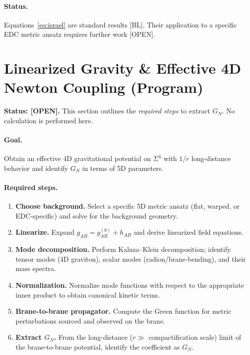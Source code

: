 \documentclass[11pt,a4paper]{article}
\newcommand{\tagBL}{\textcolor{blue!70!black}{[BL]}}
\newcommand{\tagOPEN}{\textcolor{red!70!black}{[OPEN]}}
\begin{document}
\paragraph{Status.}
Equations~\eqref{eq:israel} are standard results \tagBL{}.
Their application to a specific EDC metric ansatz requires further work \tagOPEN{}.

\section{Linearized Gravity \& Effective 4D Newton Coupling (Program)}
\label{sec:linearized}

\begin{statusbox}
\textbf{Status: \tagOPEN{}.}
This section outlines the \emph{required steps} to extract $G_N$.
No calculation is performed here.
\end{statusbox}

\paragraph{Goal.}
Obtain an effective 4D gravitational potential on $\Sigma^4$ with $1/r$ long-distance behavior and identify $G_N$ in terms of 5D parameters.

\paragraph{Required steps.}

\begin{enumerate}[label=\textbf{Step \arabic*:}, leftmargin=2.5cm]
    \item \textbf{Choose background.} Select a specific 5D metric ansatz (flat, warped, or EDC-specific) and solve for the background geometry.

    \item \textbf{Linearize.} Expand $g_{AB} = g_{AB}^{(0)} + h_{AB}$ and derive linearized field equations.

    \item \textbf{Mode decomposition.} Perform Kaluza--Klein decomposition; identify tensor modes (4D graviton), scalar modes (radion/brane-bending), and their mass spectra.

    \item \textbf{Normalization.} Normalize mode functions with respect to the appropriate inner product to obtain canonical kinetic terms.

    \item \textbf{Brane-to-brane propagator.} Compute the Green function for metric perturbations sourced and observed on the brane.

    \item \textbf{Extract $G_N$.} From the long-distance ($r \gg$ compactification scale) limit of the brane-to-brane potential, identify the coefficient as $G_N$.
\end{enumerate}
\end{document}
